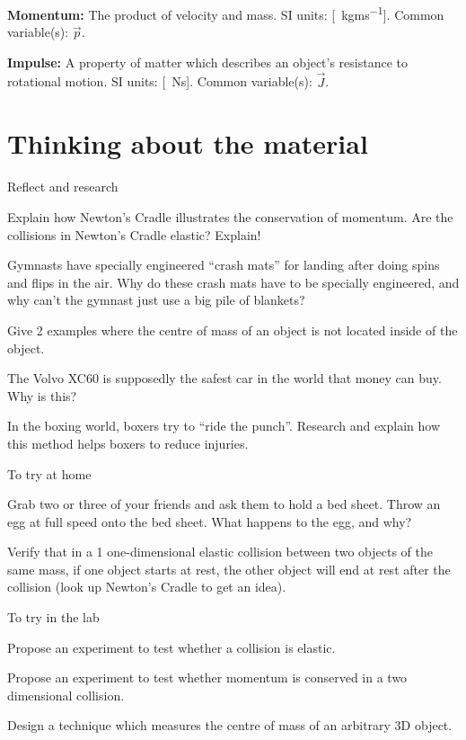 \begin{definitions}
	
	\textbf{Momentum:} The product of velocity and mass. SI units: [\SI{}{kgms^{-1}}]. Common variable(s): $\vec p$.
	\medskip
	
	\item \textbf{Impulse:} A property of matter which describes an object's resistance to rotational motion. SI units: [\SI{}{Ns}]. Common variable(s): $\vec J$.
	\medskip
	
\end{definitions}

\newpage
\section{Thinking about the material}

\begin{chapteractivity}{Reflect and research}
{
\item Explain how Newton's Cradle illustrates the conservation of momentum. Are the collisions in Newton's Cradle elastic? Explain! 
\item Gymnasts have specially engineered ``crash mats'' for landing after doing spins and flips in the air. Why do these crash mats have to be specially engineered, and why can't the gymnast just use a big pile of blankets?
\item Give 2 examples where the centre of mass of an object is not located inside of the object.
\item The Volvo XC60 is supposedly the safest car in the world that money can buy. Why is this?
\item In the boxing world, boxers try to ``ride the punch''. Research and explain how this method helps boxers to reduce injuries.
}
\end{chapteractivity}

\begin{chapteractivity}{To try at home}
{
\item Grab two or three of your friends and ask them to hold a bed sheet. Throw an egg at full speed onto the bed sheet. What happens to the egg, and why? 
\item Verify that in a 1 one-dimensional elastic collision between two objects of the same mass, if one object starts at rest, the other object will end at rest after the collision (look up Newton's Cradle to get an idea).
}
\end{chapteractivity}

\begin{chapteractivity}{To try in the lab}
{
\item Propose an experiment to test whether a collision is elastic.
\item Propose an experiment to test whether momentum is conserved in a two dimensional collision.
\item Design a technique which measures the centre of mass of an arbitrary 3D object.
}
\end{chapteractivity}

